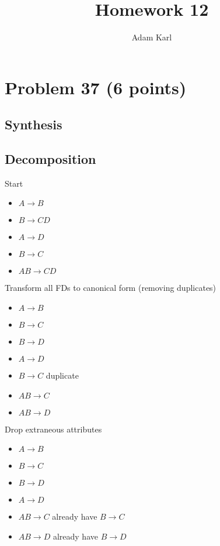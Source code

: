 \documentclass[a4paper]{article}
\title{Homework 12}
\author{Adam Karl}
\begin{document}
\maketitle

\section{Problem 37 (6 points)}
\subsection{Synthesis}

\subsection{Decomposition}
Start

\begin{itemize}
    \item $A \rightarrow B$
    \item $B \rightarrow CD$
    \item $A \rightarrow D$
    \item $B \rightarrow C$
    \item $AB \rightarrow CD$
\end{itemize}

Transform all FDs to canonical form (removing duplicates)

\begin{itemize}
    \item $A \rightarrow B$
    \item $B \rightarrow C$
    \item $B \rightarrow D$
    \item $A \rightarrow D$
    \item \sout{$B \rightarrow C$} duplicate
    \item $AB \rightarrow C$
    \item $AB \rightarrow D$
\end{itemize}

Drop extraneous attributes

\begin{itemize}
    \item $A \rightarrow B$
    \item $B \rightarrow C$
    \item $B \rightarrow D$
    \item $A \rightarrow D$
    \item \sout{$AB \rightarrow C$} already have $B \rightarrow C$
    \item \sout{$AB \rightarrow D$} already have $B \rightarrow D$
\end{itemize}
\end{document}
